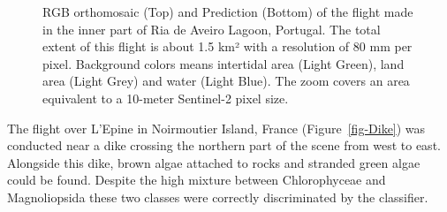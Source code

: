 \documentclass[
  number]{elsarticle}
\begin{document}
\label{cell-fig-Boat}
\begin{figure}[H]


\caption{\label{fig-Boat}RGB orthomosaic (Top) and Prediction (Bottom)
of the flight made in the inner part of Ria de Aveiro Lagoon, Portugal.
The total extent of this flight is about 1.5 km² with a resolution of 80
mm per pixel. Background colors means intertidal area (Light Green),
land area (Light Grey) and water (Light Blue). The zoom covers an area
equivalent to a 10-meter Sentinel-2 pixel size.}

\end{figure}%

The flight over L'Epine in Noirmoutier Island, France
(Figure~\ref{fig-Dike}) was conducted near a dike crossing the northern
part of the scene from west to east. Alongside this dike, brown algae
attached to rocks and stranded green algae could be found. Despite the
high mixture between Chlorophyceae and Magnoliopsida these two classes
were correctly discriminated by the classifier.
\end{document}

